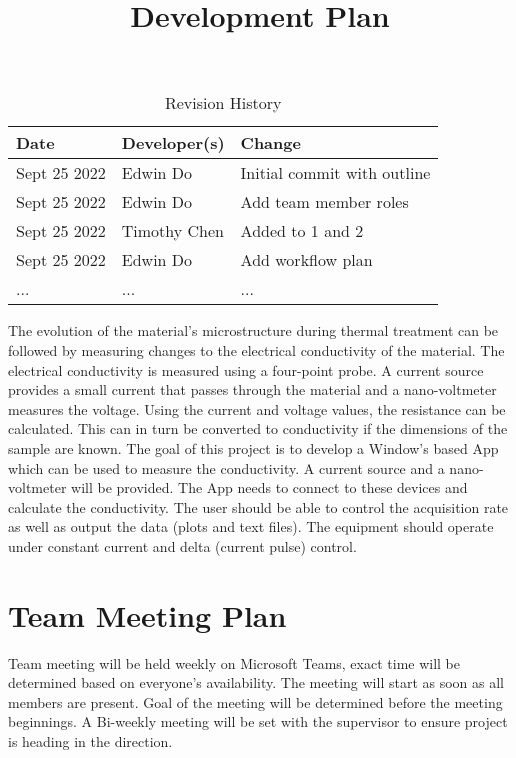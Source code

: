 \documentclass{article}
\title{Development Plan\\\progname}
\author{\authname}
\date{}
\begin{document}
\begin{table}[hp]
\caption{Revision History} \label{TblRevisionHistory}
\begin{tabularx}{\textwidth}{llX}
\toprule
\textbf{Date} & \textbf{Developer(s)} & \textbf{Change}\\
\midrule
Sept 25 2022 & Edwin Do & Initial commit with outline\\
Sept 25 2022 & Edwin Do & Add team member roles\\
Sept 25 2022 & Timothy Chen & Added to 1 and 2\\
Sept 25 2022 & Edwin Do & Add workflow plan \\
... & ... & ...\\
\bottomrule
\end{tabularx}
\end{table}

\newpage

\maketitle

\indent The evolution of the material’s microstructure during thermal treatment can be followed by measuring changes to the electrical conductivity of the material. The electrical conductivity is measured using a four-point probe. A current source provides a small current that passes through the material and a nano-voltmeter measures the voltage. Using the current and voltage values, the resistance can be calculated. This can in turn be converted to conductivity if the dimensions of the sample are known. The goal of this project is to develop a Window’s based App which can be used to measure the conductivity. A current source and a nano- voltmeter will be provided. The App needs to connect to these devices and calculate the conductivity. The user should be able to control the acquisition rate as well as output the data (plots and text files). The equipment should operate under constant current and delta (current pulse) control.

\section{Team Meeting Plan}
Team meeting will be held weekly on Microsoft Teams, exact time will be determined based on everyone's availability.
The meeting will start as soon as all members are present. 
Goal of the meeting will be determined before the meeting beginnings. 
A Bi-weekly meeting will be set with the supervisor to ensure project is heading in the direction. 
\end{document}
